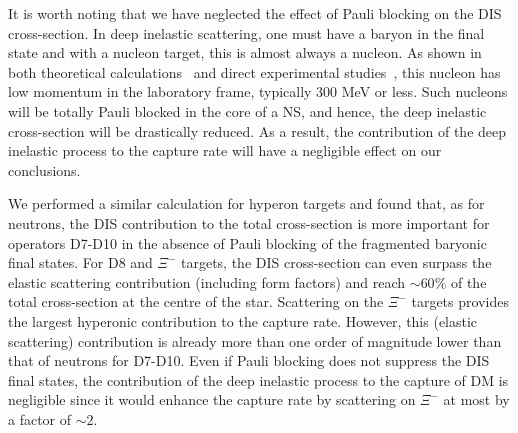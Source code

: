 It is worth noting that we have neglected the effect of Pauli blocking on the DIS cross-section. In deep inelastic scattering, one must have a baryon in the final state and with a nucleon target, this is almost always a nucleon. As shown in both theoretical calculations~\cite{Melnitchouk:1992gd_Protonproductionbias} and direct experimental studies~\cite{BEBCWA59:1989ayi_Backwardparticleproduction}, this nucleon has low momentum in the laboratory frame, typically 300 MeV or less. Such nucleons will be totally Pauli blocked in the core of a NS, and hence, the deep inelastic cross-section will be drastically reduced. 
As a result, the contribution of the deep inelastic process to the capture rate will have a negligible effect on our conclusions. 

We performed a similar calculation for hyperon targets and found that, as for neutrons, the DIS contribution to the total cross-section is more important for operators D7-D10 in the absence of Pauli blocking of the fragmented baryonic final states. For D8 and  $\Xi^-$ targets, the DIS cross-section can even surpass the elastic scattering contribution (including form factors) and reach $\sim60\%$ of the total cross-section at the centre of the star. Scattering on the $\Xi^-$ targets provides the largest hyperonic contribution to the capture rate. However, this (elastic scattering) contribution is already more than one order of magnitude lower than that of neutrons for D7-D10.  
Even if Pauli blocking does not suppress the DIS final states, the contribution of the deep inelastic process to the capture of DM is negligible since it would enhance the capture rate by scattering on $\Xi^-$ at most by a factor of $\sim2$. 

